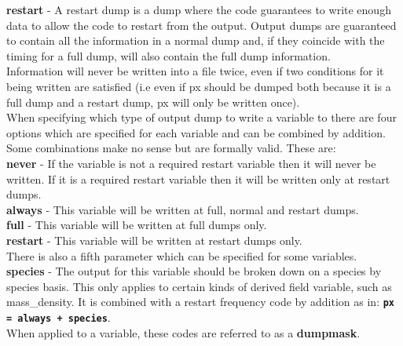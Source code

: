 \documentclass[12pt,a4paper]{article}
\newcommand{\emphtext}{\color{warwickdark} \fontfamily{phv}\selectfont\large\bf}
\newcommand{\inlinecode}[1]{{\color{warwickred} \bf\texttt{#1}}}
\newcommand{\inlineemph}[1]{{\color{warwicklight} \bf{#1}}}
\begin{document}
{\emphtext restart} - A restart dump is a dump where the code guarantees to
write enough data to allow the code to restart from the output. Output dumps
are guaranteed to contain all the information in a normal dump and, if they
coincide with the timing for a full dump, will also contain the full dump
information.\\

Information will never be written into a file twice, even if two conditions for
it being written are satisfied (i.e even if px should be dumped both because it
is a full dump and a restart dump, px will only be written once).\\

When specifying which type of output dump to write a variable to there are four
options which are specified for each variable and can be combined by
addition. Some combinations make no sense but are formally
valid. These are:\\

{\emphtext never} - If the variable is not a required restart variable then it
will never be written. If it is a required restart variable then it will be
written only at restart dumps.\\

{\emphtext always} - This variable will be written at full, normal and restart
dumps.\\

{\emphtext full} - This variable will be written at full dumps only.\\

{\emphtext restart} - This variable will be written at restart dumps only.\\

There is also a fifth parameter which can be specified for some variables.\\

{\emphtext species} - The output for this variable should be broken down on a
species by species basis. This only applies to certain kinds of derived field
variable, such as mass\_density. It is combined with a restart frequency code
by addition as in: \inlinecode{px = always + species}.\\

When applied to a variable, these codes are referred to as a
\inlineemph{dumpmask}.
\end{document}
